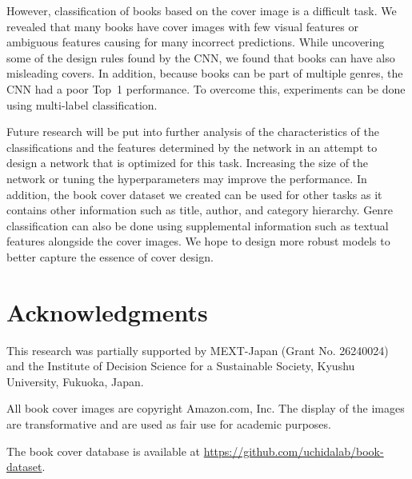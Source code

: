 \documentclass[conference]{IEEEtran}
\begin{document}
However, classification of books based on the cover image is a difficult task.
We revealed that many books have cover images with few visual features or ambiguous features causing for many incorrect predictions.
While uncovering some of the design rules found by the CNN, we found that books can have also misleading covers.
In addition, because books can be part of multiple genres, the CNN had a poor Top~1 performance.
To overcome this, experiments can be done using multi-label classification.

Future research will be put into further analysis of the characteristics of the classifications and the features determined by the network in an attempt to design a network that is optimized for this task.
Increasing the size of the network or tuning the hyperparameters may improve the performance.
In addition, the book cover dataset we created can be used for other tasks as it contains other information such as title, author, and category hierarchy.
Genre classification can also be done using supplemental information such as textual features alongside the cover images.
We hope to design more robust models to better capture the essence of cover design.

\section*{Acknowledgments}
This research was partially supported by MEXT-Japan (Grant No. 26240024) and the Institute of Decision Science for a Sustainable Society, Kyushu University, Fukuoka, Japan.

All book cover images are copyright Amazon.com, Inc. The display of the images are transformative and are used as fair use for academic purposes.

The book cover database is available at \url{https://github.com/uchidalab/book-dataset}. 



\end{document}
